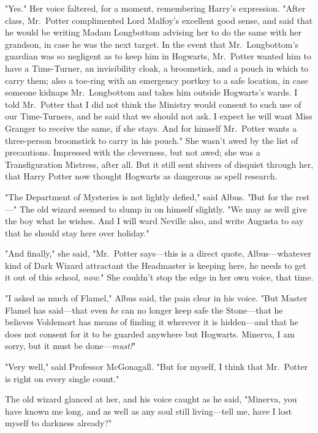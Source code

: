 "Yes." Her voice faltered, for a moment, remembering Harry's expression. "After
class, Mr.~Potter complimented Lord Malfoy's excellent good sense, and said
that he would be writing Madam Longbottom advising her to do the same with her
grandson, in case he was the next target. In the event that Mr.~Longbottom's
guardian was so negligent as to keep him in Hogwarts, Mr.~Potter wanted him to
have a Time-Turner, an invisibility cloak, a broomstick, and a pouch in which
to carry them; also a toe-ring with an emergency portkey to a safe location, in
case someone kidnaps Mr.~Longbottom and takes him outside Hogwarts's wards. I
told Mr.~Potter that I did not think the Ministry would consent to such use of
our Time-Turners, and he said that we should not ask. I expect he will want
Miss Granger to receive the same, if she stays. And for himself Mr.~Potter
wants a three-person broomstick to carry in his pouch." She wasn't awed by the
list of precautions. Impressed with the cleverness, but not awed; she was a
Transfiguration Mistress, after all. But it still sent shivers of disquiet
through her, that Harry Potter now thought Hogwarts as dangerous as spell
research.

"The Department of Mysteries is not lightly defied," said Albus. "But for the
rest---" The old wizard seemed to slump in on himself slightly. "We may as well
give the boy what he wishes. And I will ward Neville also, and write Augusta to
say that he should stay here over holiday."

"And finally," she said, "Mr.~Potter says---this is a direct quote,
Albus---whatever kind of Dark Wizard attractant the Headmaster is keeping here,
he needs to get it out of this school, \emph{now}." She couldn't stop the edge
in her own voice, that time.

"I asked as much of Flamel," Albus said, the pain clear in his voice. "But
Master Flamel has said---that even \emph{he} can no longer keep safe the
Stone---that he believes Voldemort has means of finding it wherever it is
hidden---and that he does not consent for it to be guarded anywhere but
Hogwarts. Minerva, I am sorry, but it must be done---\emph{must!}"

"Very well," said Professor McGonagall. "But for myself, I think that
Mr.~Potter is right on every single count."

The old wizard glanced at her, and his voice caught as he said, "Minerva, you
have known me long, and as well as any soul still living---tell me, have I lost
myself to darkness already?"


